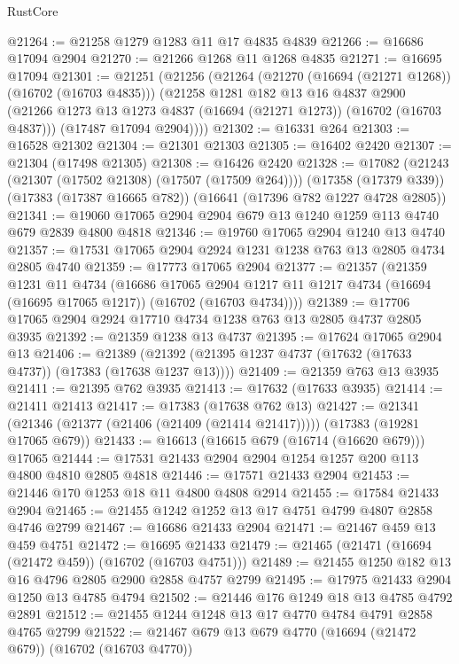 \begin{lexlean}{RustCore}
\begin{coremodule}
@21264 := @21258 @1279 @1283 @11 @17 @4835 @4839
@21266 := @16686 @17094 @2904
@21270 := @21266 @1268 @11 @1268 @4835
@21271 := @16695 @17094
@21301 := @21251
    (@21256
      (@21264
        (@21270 (@16694 (@21271 @1268)) (@16702 (@16703 @4835)))
        (@21258
          @1281
          @182
          @13
          @16
          @4837
          @2900
          (@21266 @1273 @13 @1273 @4837 (@16694 (@21271 @1273)) (@16702 (@16703 @4837)))
          (@17487 @17094 @2904))))
@21302 := @16331 @264
@21303 := @16528 @21302
@21304 := @21301 @21303
@21305 := @16402 @2420
@21307 := @21304 (@17498 @21305)
@21308 := @16426 @2420
@21328 := @17082
    (@21243 (@21307 (@17502 @21308) (@17507 (@17509 @264))))
    (@17358 (@17379 @339))
    (@17383 (@17387 @16665 @782))
    (@16641 (@17396 @782 @1227 @4728 @2805))
@21341 := @19060 @17065 @2904 @2904 @679 @13 @1240 @1259 @113 @4740 @679 @2839 @4800 @4818
@21346 := @19760 @17065 @2904 @1240 @13 @4740
@21357 := @17531 @17065 @2904 @2924 @1231 @1238 @763 @13 @2805 @4734 @2805 @4740
@21359 := @17773 @17065 @2904
@21377 := @21357
    (@21359
      @1231
      @11
      @4734
      (@16686
        @17065
        @2904
        @1217
        @11
        @1217
        @4734
        (@16694 (@16695 @17065 @1217))
        (@16702 (@16703 @4734))))
@21389 := @17706 @17065 @2904 @2924 @17710 @4734 @1238 @763 @13 @2805 @4737 @2805 @3935
@21392 := @21359 @1238 @13 @4737
@21395 := @17624 @17065 @2904 @13
@21406 := @21389 (@21392 (@21395 @1237 @4737 (@17632 (@17633 @4737)) (@17383 (@17638 @1237 @13))))
@21409 := @21359 @763 @13 @3935
@21411 := @21395 @762 @3935
@21413 := @17632 (@17633 @3935)
@21414 := @21411 @21413
@21417 := @17383 (@17638 @762 @13)
@21427 := @21341 (@21346 (@21377 (@21406 (@21409 (@21414 @21417))))) (@17383 (@19281 @17065 @679))
@21433 := @16613 (@16615 @679 (@16714 (@16620 @679))) @17065
@21444 := @17531 @21433 @2904 @2904 @1254 @1257 @200 @113 @4800 @4810 @2805 @4818
@21446 := @17571 @21433 @2904
@21453 := @21446 @170 @1253 @18 @11 @4800 @4808 @2914
@21455 := @17584 @21433 @2904
@21465 := @21455 @1242 @1252 @13 @17 @4751 @4799 @4807 @2858 @4746 @2799
@21467 := @16686 @21433 @2904
@21471 := @21467 @459 @13 @459 @4751
@21472 := @16695 @21433
@21479 := @21465 (@21471 (@16694 (@21472 @459)) (@16702 (@16703 @4751)))
@21489 := @21455 @1250 @182 @13 @16 @4796 @2805 @2900 @2858 @4757 @2799
@21495 := @17975 @21433 @2904 @1250 @13 @4785 @4794
@21502 := @21446 @176 @1249 @18 @13 @4785 @4792 @2891
@21512 := @21455 @1244 @1248 @13 @17 @4770 @4784 @4791 @2858 @4765 @2799
@21522 := @21467 @679 @13 @679 @4770 (@16694 (@21472 @679)) (@16702 (@16703 @4770))

\end{coremodule}
\end{lexlean}
